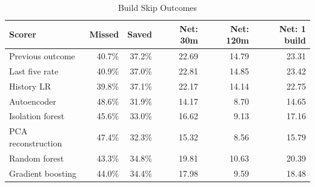 \begin{table}[htbp]
\centering
\scriptsize\setlength{\tabcolsep}{2pt}
\caption{Build Skip Outcomes}
\label{tab:skip}
\begin{tabular}{lrrrrr}
\toprule
Scorer & Missed & Saved & Net: 30m & Net: 120m & Net: 1 build \\
\midrule
Previous outcome & 40.7\% & 37.2\% & 22.69 & 14.79 & 23.31 \\
Last five rate & 40.9\% & 37.0\% & 22.81 & 14.85 & 23.42 \\
History LR & 39.8\% & 37.1\% & 22.17 & 14.14 & 22.75 \\
Autoencoder & 48.6\% & 31.9\% & 14.17 & 8.70 & 14.65 \\
Isolation forest & 45.6\% & 33.0\% & 16.62 & 9.13 & 17.16 \\
PCA reconstruction & 47.4\% & 32.3\% & 15.32 & 8.56 & 15.79 \\
Random forest & 43.3\% & 34.8\% & 19.81 & 10.63 & 20.39 \\
Gradient boosting & 44.0\% & 34.4\% & 17.98 & 9.59 & 18.48 \\
\bottomrule
\end{tabular}
\end{table}

